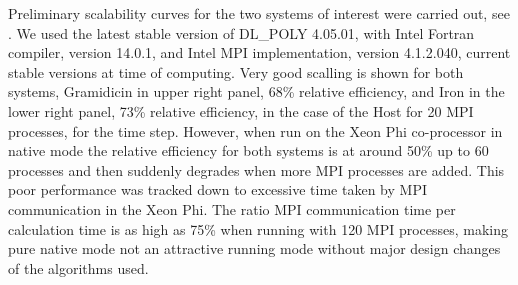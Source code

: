 \par{Preliminary scalability curves for the two systems of interest were carried out, see . We used the latest 
stable version of DL\_POLY 4.05.01, with Intel Fortran compiler, version 14.0.1, and Intel MPI implementation, version 4.1.2.040, 
current stable versions at time of computing. Very good scalling is shown for both systems, Gramidicin in upper right panel, 68\% 
relative efficiency, and Iron in the lower right panel, 73\% relative efficiency, in the case of the Host for 20 MPI processes,
for the time step. However, when run on the Xeon Phi co-processor in native mode the relative efficiency for both 
systems is at around 50\% up to 60 processes and then suddenly degrades when more MPI processes are added. This poor performance 
was tracked down to excessive time taken by MPI communication in the Xeon Phi. The ratio MPI communication time per calculation 
time is as high as 75\% when running with 120 MPI processes, making pure native mode not an attractive running mode without 
major design changes of the algorithms used.}

